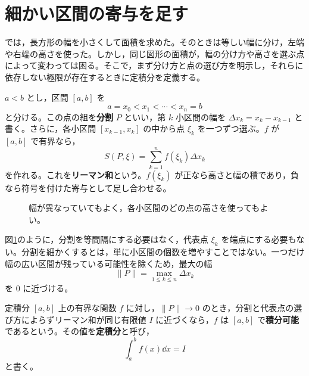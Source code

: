\section{細かい区間の寄与を足す}\label{節:リーマン和}
では，長方形の幅を小さくして面積を求めた。そのときは等しい幅に分け，左端や右端の高さを使った。しかし，同じ図形の面積が，幅の分け方や高さを選ぶ点によって変わっては困る。そこで，まず分け方と点の選び方を明示し，それらに依存しない極限が存在するときに定積分を定義する。

$a<b$ とし，区間 $[a,b]$ を
\[
 a=x_0<x_1<\cdots<x_n=b
\]
と分ける。この点の組を\textbf{分割} $P$ といい，第 $k$ 小区間の幅を $\Delta x_k=x_k-x_{k-1}$ と書く。さらに，各小区間 $[x_{k-1},x_k]$ の中から点 $\xi_k$ を一つずつ選ぶ。$f$ が $[a,b]$ で有界なら，
\[
 S(P,\xi)=\sum_{k=1}^{n}f(\xi_k)\Delta x_k
\]
を作れる。これを\textbf{リーマン和}という。$f(\xi_k)$ が正なら高さと幅の積であり，負なら符号を付けた寄与として足し合わせる。

\begin{figure}[htbp]
\centering
{}
\caption{幅が異なっていてもよく，各小区間のどの点の高さを使ってもよい。}
\label{図:リーマン和}
\end{figure}

図\ref{図:リーマン和}のように，分割を等間隔にする必要はなく，代表点 $\xi_k$ を端点にする必要もない。分割を細かくするとは，単に小区間の個数を増やすことではない。一つだけ幅の広い区間が残っている可能性を除くため，最大の幅
\[
 \|P\|=\max_{1\le k\le n}\Delta x_k
\]
を $0$ に近づける。

\begin{definition}{定積分}
$[a,b]$ 上の有界な関数 $f$ に対し，$\|P\|\to0$ のとき，分割と代表点の選び方によらずリーマン和が同じ有限値 $I$ に近づくなら，$f$ は $[a,b]$ で\textbf{積分可能}であるという。その値を\textbf{定積分}と呼び，
\[
 \int_a^b f(x)\dd x=I
\]
と書く。
\end{definition}

